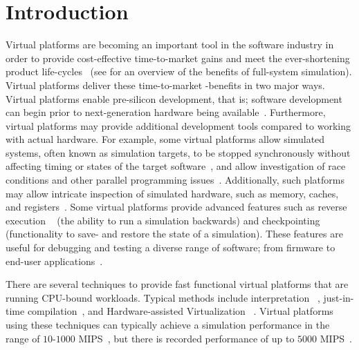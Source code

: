 
\section{Introduction}
\label{sec:introduction}
Virtual platforms are becoming an important tool in the software industry in order to provide cost-effective time-to-market gains and meet the ever-shortening product life-cycles~ (see  for an overview of the benefits of full-system simulation).
Virtual platforms deliver these time-to-market -benefits in two major ways.
Virtual platforms enable pre-silicon development, that is; software development can begin prior to next-generation hardware being available~.
Furthermore, virtual platforms may provide additional development tools compared to working with actual hardware.
For example, some virtual platforms allow simulated systems, often known as simulation targets, to be stopped synchronously without affecting timing or states of the target software~, and allow investigation of race conditions and other parallel programming issues~.
Additionally, such platforms may allow intricate inspection of simulated hardware, such as memory, caches, and registers~.
Some virtual platforms provide advanced features such as reverse execution ~ (the ability to run a simulation backwards) and checkpointing ~ (functionality to save- and restore the state of a simulation).
These features are useful for debugging and testing a diverse range of software; from firmware to end-user applications~.

There are several techniques to provide fast functional virtual platforms that are running CPU-bound workloads.
Typical methods include interpretation ~, just-in-time compilation~, and Hardware-assisted Virtualization ~.
Virtual platforms using these techniques can typically achieve a simulation performance in the range of $10$-$1000$ MIPS~, but there is recorded performance of up to $5000$ MIPS~.

